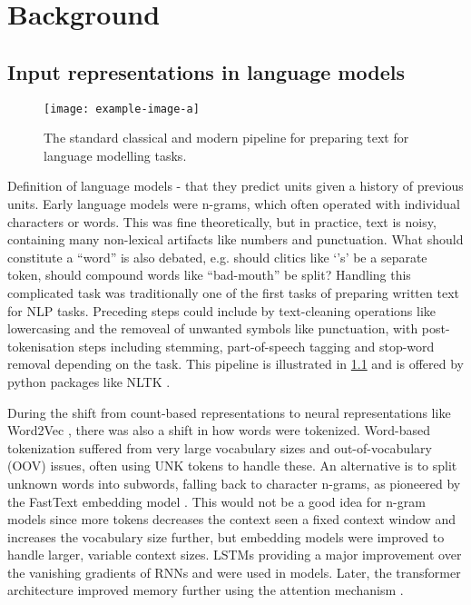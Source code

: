 \chapter{Background}\label{chapter:background}


\section{Input representations in language models}\label{sec:12-tokenization}


\begin{figure}[t]
    \centering
    \texttt{[image: example-image-a]}
    \caption{The standard classical and modern pipeline for preparing text for language modelling tasks.}
    \label{fig:12-pipelinecomparison}
\end{figure}

Definition of language models - that they predict units given a history of previous units. Early language models were n-grams, which often operated with individual characters or words. This was fine theoretically, but in practice, text is noisy, containing many non-lexical artifacts like numbers and punctuation. What should constitute a ``word'' is also debated, e.g. should clitics like `'s' be a separate token, should compound words like ``bad-mouth'' be split? Handling this complicated task was traditionally one of the first tasks of preparing written text for NLP tasks. Preceding steps could include by text-cleaning operations like lowercasing and the removeal of unwanted symbols like punctuation, with post-tokenisation steps including stemming, part-of-speech tagging and stop-word removal depending on the task. This pipeline is illustrated in \cref{fig:12-pipelinecomparison} and is offered by python packages like NLTK \addcites.

During the shift from count-based representations to neural representations like Word2Vec \addcites, there was also a shift in how words were tokenized. Word-based tokenization suffered from very large vocabulary sizes and out-of-vocabulary (OOV) issues, often using UNK tokens to handle these. An alternative is to split unknown words into subwords, falling back to character n-grams, as pioneered by the FastText embedding model \addcites. This would not be a good idea for n-gram models since more tokens decreases the context seen a fixed context window and increases the vocabulary size further, but embedding models were improved to handle larger, variable context sizes. LSTMs providing a major improvement over the vanishing gradients of RNNs and were used in \writemore models. Later, the transformer architecture improved memory further using the attention mechanism \addcites.

